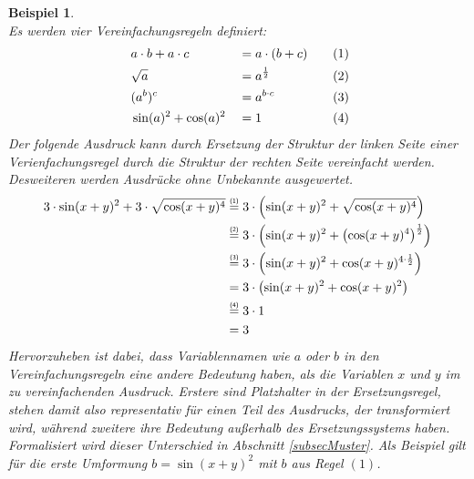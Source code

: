 \newtheorem{bsp}{Beispiel}[section]
\begin{bsp}~\\
Es werden vier Vereinfachungsregeln definiert:
\begin{alignat*}{4}
    ~& a \cdot b + a \cdot c & &= a \cdot (b + c) &~~~& (1) \\
    ~& \sqrt{a}              & &= a^{\frac 1 2}   &~~~& (2) \\
    ~& (a^b)^c         & &= a^{b \cdot c}   &~~~& (3) \\
    ~& \sin(a)^2 + \cos(a)^2 & &= 1               &~~~& (4)
\end{alignat*}
Der folgende Ausdruck kann durch Ersetzung der Struktur der linken Seite einer Verienfachungsregel durch die Struktur der rechten Seite vereinfacht werden. Desweiteren werden Ausdrücke ohne Unbekannte ausgewertet.
\begin{equation*}
    \begin{split}
	3 \cdot \sin(x + y)^2 + 3 \cdot \sqrt{\cos(x + y)^4}
	&\stapel = {(1)} 3 \cdot \paren*{\sin(x + y)^2 + \sqrt{\cos(x + y)^4}} \\
	&\stapel = {(2)} 3 \cdot \paren*{\sin(x + y)^2 + \paren*{{\cos(x + y)^4}}^{\frac 1 2}}\\
	&\stapel = {(3)} 3 \cdot \paren*{\sin(x + y)^2 + {\cos(x + y)^{4 \cdot \frac 1 2}}}\\
	& =              3 \cdot \paren*{\sin(x + y)^2 + {\cos(x + y)^2}}\\
	&\stapel = {(4)} 3 \cdot 1\\
    & = 3
    \end{split}
\end{equation*}
Hervorzuheben ist dabei, dass Variablennamen wie $a$ oder $b$ in den Vereinfachungsregeln eine andere Bedeutung haben, als die Variablen $x$ und $y$ im zu vereinfachenden Ausdruck. Erstere sind Platzhalter in der Ersetzungsregel, stehen damit also representativ für einen Teil des Ausdrucks, der transformiert wird, während zweitere ihre Bedeutung außerhalb des Ersetzungssystems haben. Formalisiert wird dieser Unterschied in Abschnitt \ref{subsecMuster}. Als Beispiel gilt für die erste Umformung $b = \sin(x + y)^2$ mit $b$ aus Regel $(1)$.
\end{bsp}

